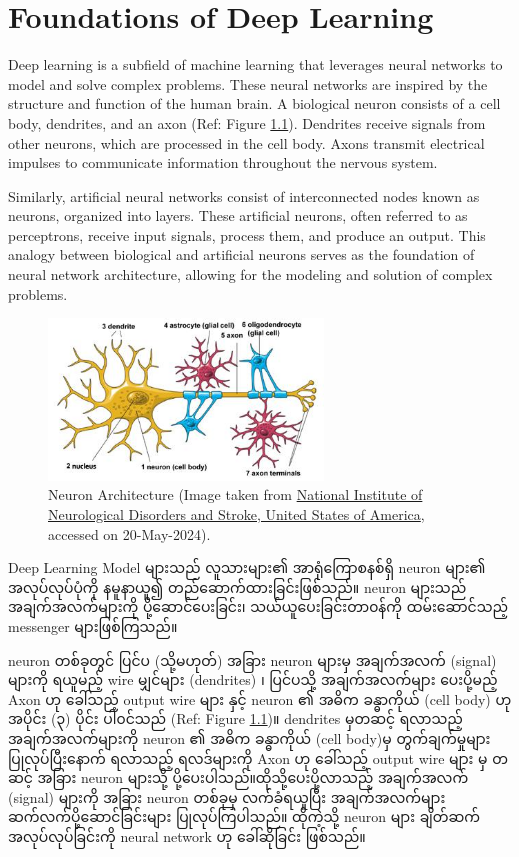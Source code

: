 \chapter{Foundations of Deep Learning}
\label{ch:SNN}
Deep learning is a subfield of machine learning that leverages neural networks to model and solve complex problems. These neural networks are inspired by the structure and function of the human brain. A biological neuron consists of a cell body, dendrites, and an axon (Ref: Figure \ref{fig:neurons}). Dendrites receive signals from other neurons, which are processed in the cell body. Axons transmit electrical impulses to communicate information throughout the nervous system.

Similarly, artificial neural networks consist of interconnected nodes known as neurons, organized into layers. These artificial neurons, often referred to as perceptrons, receive input signals, process them, and produce an output. This analogy between biological and artificial neurons serves as the foundation of neural network architecture, allowing for the modeling and solution of complex problems.

\vspace{1.5em}

\begin{figure}[h]%
\centering
\includegraphics[width=0.65\textwidth]{imgs/NeuronArchitecture.jpg}
\caption{Neuron Architecture (Image taken from \href{https://www.ninds.nih.gov/}{National Institute of Neurological Disorders and Stroke, United States of America}, accessed on 20-May-2024).}\label{fig:neurons}
\end{figure}

\noindent Deep Learning Model များသည်  လူသားများ၏ အာရုံကြောစနစ်ရှိ neuron များ၏ အလုပ်လုပ်ပုံကို နမူနာယူ၍ တည်ဆောက်ထားခြင်းဖြစ်သည်။ neuron များသည် အချက်အလက်များကို ပို့ဆောင်ပေးခြင်း၊ သယ်ယူပေးခြင်းတာ၀န်ကို ထမ်းဆောင်သည့် messenger များဖြစ်ကြသည်။ 

neuron တစ်ခုတွင် ပြင်ပ (သို့မဟုတ်) အခြား neuron များမှ အချက်အလက် (signal) များကို ရယူမည့်  wire မျှင်များ (dendrites) ၊ ပြင်ပသို့ အချက်အလက်များ ပေးပို့မည့် Axon ဟု ခေါ်သည့် output wire များ နှင့် neuron ၏ အဓိက ခန္ဓာကိုယ် (cell body) ဟု အပိုင်း (၃) ပိုင်း ပါ၀င်သည် (Ref: Figure \ref{fig:neurons})။ dendrites မှတဆင့် ရလာသည့် အချက်အလက်များကို neuron ၏ အဓိက ခန္ဓာကိုယ် (cell body)မှ တွက်ချက်မှုများ ပြုလုပ်ပြီးနောက် ရလာသည့် ရလဒ်များကို Axon ဟု ခေါ်သည့် output wire များ မှ တဆင့် အခြား neuron များသို့ ပို့ပေးပါသည်။ထိုသို့ပေးပို့လာသည့် အချက်အလက် (signal) များကို အခြား neuron တစ်ခုမှ လက်ခံရယူပြီး အချက်အလက်များ ဆက်လက်ပို့ဆောင်ခြင်းများ ပြုလုပ်ကြပါသည်။ ထိုကဲ့သို့ neuron များ ချိတ်ဆက် အလုပ်လုပ်ခြင်းကို neural network ဟု ခေါ်ဆိုခြင်း ဖြစ်သည်။ 

